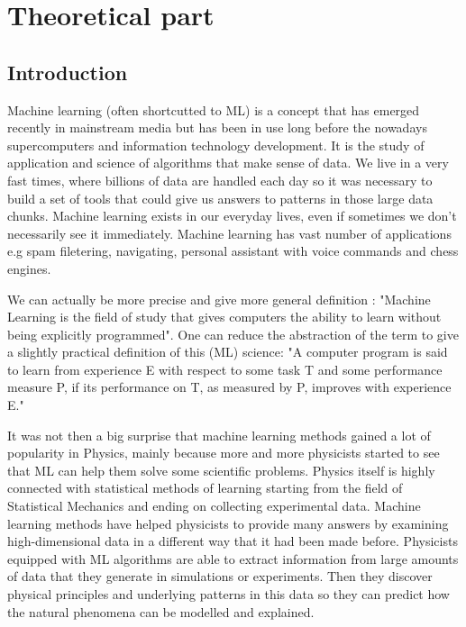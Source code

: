 \documentclass[a4paper,oneside,openright,11pt]{book}
\begin{document}
\part{Theoretical part}

\chapter{Introduction}

Machine learning (often shortcutted to ML) is a concept that has emerged recently in mainstream media but has been in use long before the nowadays supercomputers and information technology development. It is the study of application and science of algorithms that make sense of data. We live in a very fast times, where billions of data are handled each day so it was necessary to build a set of tools that could give us answers to patterns in those large data chunks. Machine learning exists in our everyday lives, even if sometimes we don't necessarily see it immediately. Machine learning has vast number of applications e.g spam filetering, navigating, personal assistant with voice commands and chess engines.

We can actually be more precise and give more general definition \cite{aurelion}: "Machine Learning is the field of study that gives computers the ability to learn without being explicitly programmed". One can reduce the abstraction of the term to give a slightly practical definition of this (ML) science: "A computer program is said to learn from experience E with respect to some task T and some performance measure P, if its performance on T, as measured by P, improves with experience E."

It was not then a big surprise that machine learning methods gained a lot of popularity in Physics, mainly because more and more physicists started to see that ML can help them solve some scientific problems. Physics itself is highly connected with statistical methods of learning starting from the field of Statistical Mechanics and ending on collecting experimental data. Machine learning methods have helped physicists to provide many answers by examining high-dimensional data in a different way that it had been made before. Physicists equipped with ML algorithms are able to extract information from large amounts of data  that they generate in simulations or experiments. Then they discover physical principles and underlying patterns in this data so they can predict how the natural phenomena can be modelled and explained. \cite{ucla}
\end{document}
